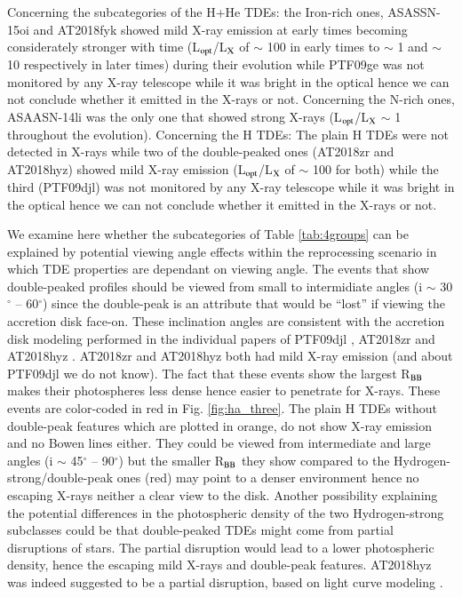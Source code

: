 \documentclass[structabstract]{aa}
\begin{document}
Concerning the subcategories of the H+He TDEs: the Iron-rich ones, ASASSN-15oi and AT2018fyk showed mild X-ray emission at early times becoming considerately stronger with time (L$_{\rm opt}$/L$_{\rm X}$ of $\sim$ 100 in early times to $\sim$ 1 and $\sim$ 10 respectively in later times) during their evolution while PTF09ge was not monitored by any X-ray telescope while it was bright in the optical hence we can not conclude whether it emitted in the X-rays or not. Concerning the N-rich ones, ASAASN-14li was the only one that showed strong X-rays (L$_{\rm opt}$/L$_{\rm X}$ $\sim$ 1 throughout the evolution). Concerning the H TDEs: The plain H TDEs were not detected in X-rays while two of the double-peaked ones (AT2018zr and AT2018hyz) showed mild X-ray emission (L$_{\rm opt}$/L$_{\rm X}$ of $\sim$ 100 for both) while the third (PTF09djl) was not monitored by any X-ray telescope while it was bright in the optical hence we can not conclude whether it emitted in the X-rays or not. 

We examine here whether the subcategories of Table \ref{tab:4groups} can be explained by potential viewing angle effects within the reprocessing scenario \citep{Dai2018} in which TDE properties are dependant on viewing angle. The events that show double-peaked profiles should be viewed from small to intermidiate angles (i $\sim$ 30$^{\circ}$ -- 60$^{\circ}$) since the double-peak is an attribute that would be ``lost'' if viewing the accretion disk face-on. These inclination angles are consistent with the accretion disk modeling performed in the individual papers of PTF09djl \citep{Arcavi2014}, AT2018zr \citep{Holoien2016} and AT2018hyz \citep{Short2020a,Hung2020}. AT2018zr and AT2018hyz both had mild X-ray emission (and about PTF09djl we do not know). The fact that these events show the largest R$_{\rm BB}$ makes their photospheres less dense hence easier to penetrate for X-rays. These events are color-coded in red in Fig. \ref{fig:ha_three}. The plain H TDEs without double-peak features which are plotted in orange, do not show X-ray emission and no Bowen lines either. They could be viewed from intermediate and large angles (i $\sim$ 45$^{\circ}$ -- 90$^{\circ}$) but the smaller R$_{\rm BB}$ they show compared to the Hydrogen-strong/double-peak ones (red) may point to a denser environment hence no escaping X-rays neither a clear view to the disk. Another possibility %
explaining the potential differences in the photospheric density of the two Hydrogen-strong subclasses could be %
that double-peaked TDEs might come from partial disruptions of stars. The partial disruption would lead to a lower photospheric density, hence the escaping mild X-rays and double-peak features. AT2018hyz was indeed suggested to be a partial disruption, based on light curve modeling \citep{gomez1925}.  
\end{document}
